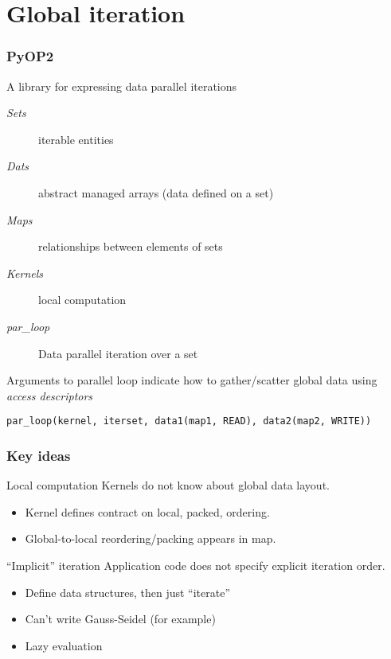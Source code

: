 \documentclass[presentation]{beamer}
\begin{document}
\section{Global iteration}

\begin{frame}[fragile]
  \frametitle{PyOP2}
  A library for expressing data parallel iterations
\begin{description}
\item[{\emph{Sets}}] iterable entities
\item[{\emph{Dats}}] abstract managed arrays (data defined on a set)
\item[{\emph{Maps}}] relationships between elements of sets
\item[{\emph{Kernels}}] local computation
\item[{\emph{par\_loop}}] Data parallel iteration over a set
\end{description}
Arguments to parallel loop indicate how to gather/scatter global
data using \emph{access descriptors}

\begin{verbatim}
par_loop(kernel, iterset, data1(map1, READ), data2(map2, WRITE))
\end{verbatim}
\end{frame}

\begin{frame}
  \frametitle{Key ideas}
  \begin{block}{Local computation}
    Kernels do not know about global data layout.
    \begin{itemize}
    \item Kernel defines contract on local, packed, ordering.
    \item Global-to-local reordering/packing appears in map.
    \end{itemize}
  \end{block}
  \begin{block}{``Implicit'' iteration}
    Application code does not specify explicit iteration order.
    \begin{itemize}
    \item Define data structures, then just ``iterate''
    \item Can't write Gauss-Seidel (for example)
    \item Lazy evaluation
    \end{itemize}
  \end{block}
\end{frame}
\end{document}
